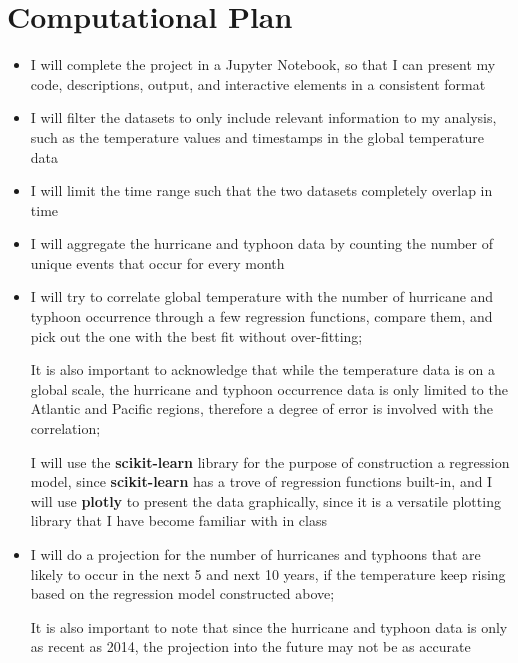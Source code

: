 \documentclass[fontsize=11pt]{article}
\begin{document}
\section*{Computational Plan}
\begin{itemize}
    \item I will complete the project in a Jupyter Notebook, so that I can present my code, descriptions, output, and interactive elements in a consistent format

    \item I will filter the datasets to only include relevant information to my analysis, such as the temperature values and timestamps in the global temperature data
    
    \item I will limit the time range such that the two datasets completely overlap in time
    
    
    \item I will aggregate the hurricane and typhoon data by counting the number of unique events that occur for every month
    
    \item I will try to correlate global temperature with the number of hurricane and typhoon occurrence through a few regression functions, compare them, and pick out the one with the best fit without over-fitting; 
    
    It is also important to acknowledge that while the temperature data is on a global scale, the hurricane and typhoon occurrence data is only limited to the Atlantic and Pacific regions, therefore a degree of error is involved with the correlation;
    
    I will use the \textbf{scikit-learn} library for the purpose of construction a regression model, since \textbf{scikit-learn} has a trove of regression functions built-in, and I will use \textbf{plotly} to present the data graphically, since it is a versatile plotting library that I have become familiar with in class
    
    \item I will do a projection for the number of hurricanes and typhoons that are likely to occur in the next 5 and next 10 years, if the temperature keep rising based on the regression model constructed above;
    
    It is also important to note that since the hurricane and typhoon data is only as recent as 2014, the projection into the future may not be as accurate
    

\end{itemize}
\end{document}

